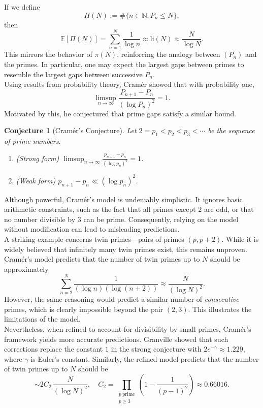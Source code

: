 \documentclass[11pt, reqno]{article}
\newtheorem{conjecture}{Conjecture}
\begin{document}
If we define
\[
\Pi(N) := \#\{ n \in \mathbb{N} : P_n \le N \},
\]
then
\[
\mathbb{E}[\Pi(N)] = \sum_{n=1}^N \frac{1}{\log n} \approx \mathrm{li}(N) \approx \frac{N}{\log N}.
\]
This mirrors the behavior of $\pi(N)$, reinforcing the analogy between $(P_n)$ and the primes. In particular, one may expect the largest gaps between primes to resemble the largest gaps between successive $P_n$. \\

Using results from probability theory, Cram\'er showed that with probability one,
\[
\limsup_{n\to\infty} \frac{P_{n+1}-P_n}{(\log P_n)^2} = 1.
\]
Motivated by this, he conjectured that prime gaps satisfy a similar bound.

\begin{conjecture}[Cram\'er’s Conjecture]
Let $2=p_1<p_2<p_3<\cdots$ be the sequence of prime numbers.
\begin{enumerate}
    \item[(a)] (Strong form) $\displaystyle \limsup_{n\to\infty} \frac{p_{n+1}-p_n}{(\log p_n)^2} = 1$.
    \item[(b)] (Weak form) $\displaystyle p_{n+1}-p_n \ll (\log p_n)^2$.
\end{enumerate}
\end{conjecture}

Although powerful, Cram\'er’s model is undeniably simplistic. It ignores basic arithmetic constraints, such as the fact that all primes except $2$ are odd, or that no number divisible by $3$ can be prime. Consequently, relying on the model without modification can lead to misleading predictions. \\

A striking example concerns twin primes—pairs of primes $(p,p+2)$. While it is widely believed that infinitely many twin primes exist, this remains unproven. Cram\'er’s model predicts that the number of twin primes up to $N$ should be approximately
\[
\sum_{n=2}^N \frac{1}{(\log n)(\log(n+2))} \approx \frac{N}{(\log N)^2}.
\]
However, the same reasoning would predict a similar number of \emph{consecutive} primes, which is clearly impossible beyond the pair $(2,3)$. This illustrates the limitations of the model. \\

Nevertheless, when refined to account for divisibility by small primes, Cram\'er’s framework yields more accurate predictions. Granville showed that such corrections replace the constant $1$ in the strong conjecture with $2e^{-\gamma}\approx1.229$, where $\gamma$ is Euler’s constant. Similarly, the refined model predicts that the number of twin primes up to $N$ should be
\[
\sim 2C_2\,\frac{N}{(\log N)^2},
\quad
C_2=\prod_{\substack{p\ \text{prime}\\ p\ge3}}
\left(1-\frac{1}{(p-1)^2}\right)\approx0.66016.
\]
\end{document}
